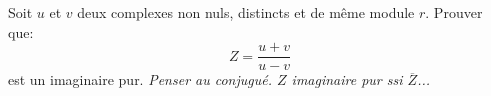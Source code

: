 \begin{exercice}
Soit $u$ et $v$ deux complexes non nuls, distincts et de
  m\^eme module $r$. Prouver que:
\[Z=\frac{u+v}{u-v}\]
est un imaginaire pur. \emph{Penser au conjugu\'e. $Z$ imaginaire pur
  ssi $\overline{Z}$...}
\end{exercice}
